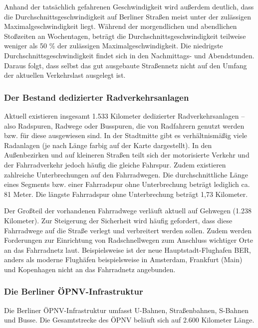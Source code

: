 Anhand der tatsächlich gefahrenen Geschwindigkeit wird außerdem deutlich, dass die Durchschnittsgeschwindigkeit auf Berliner Straßen meist unter der zulässigen Maximalgeschwindigkeit liegt. Während der morgendlichen und abendlichen Stoßzeiten an Wochentagen, beträgt die Durchschnittsgeschwindigkeit teilweise weniger als 50 \% der zulässigen Maximalgeschwindigkeit. Die niedrigste Durchschnittsgeschwindigkeit findet sich in den Nachmittags- und Abendstunden. Daraus folgt, dass selbst das gut ausgebaute Straßennetz nicht auf den Umfang der aktuellen Verkehrslast ausgelegt ist.


\subsubsection{Der Bestand dedizierter Radverkehrsanlagen}

Aktuell existieren insgesamt 1.533 Kilometer dedizierter Radverkehrsanlagen – also Radspuren, Radwege oder Busspuren, die von Radfahrern genutzt werden bzw. für diese ausgewiesen sind. In der Stadtmitte gibt es verhältnismäßig viele Radanlagen (je nach Länge farbig auf der Karte dargestellt). In den Außenbezirken und auf kleineren Straßen teilt sich der motorisierte Verkehr und der Fahrradverkehr jedoch häufig die gleiche Fahrspur. Zudem existieren zahlreiche Unterbrechungen auf den Fahrradwegen. Die durchschnittliche Länge eines Segments bzw. einer Fahrradspur ohne Unterbrechung beträgt lediglich ca. 81 Meter. Die längste Fahrradspur ohne Unterbrechung beträgt 1,73 Kilometer.

Der Großteil der vorhandenen Fahrradwege verläuft aktuell auf Gehwegen (1.238 Kilometer). Zur Steigerung der Sicherheit wird häufig gefordert, dass diese Fahrradwege auf die Straße verlegt und verbreitert werden sollen. Zudem werden Forderungen zur Einrichtung von Radschnellwegen zum Anschluss wichtiger Orte an das Fahrradnetz laut. Beispielsweise ist der neue Hauptstadt-Flughafen BER, anders als moderne Flughäfen beispielsweise in Amsterdam, Frankfurt (Main) und Kopenhagen nicht an das Fahrradnetz angebunden.


\subsubsection{Die Berliner ÖPNV-Infrastruktur}

Die Berliner ÖPNV-Infrastruktur umfasst U-Bahnen, Straßenbahnen, S-Bahnen und Busse. Die Gesamtstrecke des ÖPNV beläuft sich auf 2.600 Kilometer Länge.

